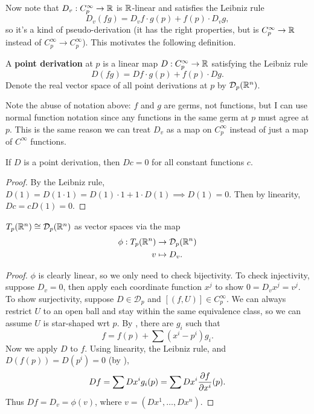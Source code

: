 \documentclass[twoside,10pt]{report}
\begin{document}
Now note that $D_{v}: C_{p}^{\infty}\to \mathbb{R}$ is $\mathbb{R}$-linear and satisfies the Leibniz rule
\[
	D_{v}(fg) = D_{v}f \cdot g(p) + f(p) \cdot D_{v}g,
\] so it's a kind of pseudo-derivation (it has the right properties, but is $C_{p}^{\infty}\to \mathbb{R}$ instead of $C_{p}^{\infty}\to C_{p}^{\infty}$). This motivates the following definition.

\begin{defn}[]
	A \textbf{point derivation} at $p$ is a linear map $D:C_{p}^{\infty}\to \mathbb{R}$ satisfying the Leibniz rule
	\[
		D(fg) = Df \cdot g(p) + f(p) \cdot Dg.
	\] 
	Denote the real vector space of all point derivations at $p$ by $\mathcal{D}_{p}(\mathbb{R}^{n})$.
\end{defn}

Note the abuse of notation above: $f$ and $g$ are germs, not functions, but I can use normal function notation since any functions in the same germ at $p$ must agree at $p$. This is the same reason we can treat $D_{v}$ as a map on $C_{p}^{\infty}$ instead of just a map of $C^{\infty}$ functions.

\begin{lem}
	\label{derivation-constant}
	If $D$ is a point derivation, then $Dc = 0$ for all constant functions $c$.
\end{lem}
\begin{proof}
	By the Leibniz rule, $D(1) = D(1\cdot 1) = D(1) \cdot 1 + 1 \cdot D(1) \implies D(1) = 0$. Then by linearity, $Dc = c D(1) = 0$.
\end{proof}

\begin{thrm}[]
	$T_{p}(\mathbb{R}^{n}) \cong \mathcal{D}_{p}(\mathbb{R}^{n})$ as vector spaces via the map
	\begin{align*}
		\phi : T_{p}(\mathbb{R}^{n}) &\to \mathcal{D}_{p}(\mathbb{R}^{n}) \\
		v &\mapsto D_{v}.
	\end{align*}
\end{thrm}
\begin{proof}
	$\phi$ is clearly linear, so we only need to check bijectivity. To check injectivity, suppose $D_{v}=0$, then apply each coordinate function $x^{j}$ to show $0=D_{v}x^{j} = v^{j}$. To show surjectivity, suppose $D \in \mathcal{D}_{p}$ and $[(f,U)] \in C_{p}^{\infty}$. We can always restrict $U$ to an open ball and stay within the same equivalence class, so we can assume $U$ is star-shaped wrt $p$. By , there are $g_{i}$ such that
	\[
		f = f(p) + \sum (x^{i}-p^{i}) g_{i}.
	\] Now we apply $D$ to $f$. Using linearity, the Leibniz rule, and $D(f(p)) = D(p^{i})=0$ (by ),
	\[
		Df = \sum Dx^{i} g_{i}(p) = \sum Dx^{i} \frac{\partial f}{\partial x^{i}} (p).
	\]
	Thus $Df = D_{v} = \phi(v)$, where $v = (Dx^{1}, \dots, Dx^{n})$.
\end{proof}
\end{document}
